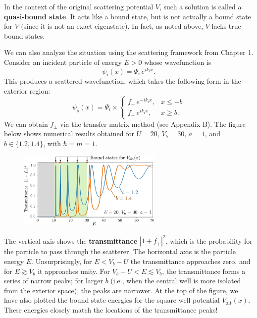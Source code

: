 \documentclass[pra,12pt]{revtex4-2}
\begin{document}
In the context of the original scattering potential $V$, such a
solution is called a \textbf{quasi-bound state}.  It acts like a bound
state, but is not actually a bound state for $V$ (since it is not an
exact eigenstate).  In fact, as noted above, $V$ lacks true bound
states.

We can also analyze the situation using the scattering framework from
Chapter 1.  Consider an incident particle of energy $E > 0$ whose
wavefunction is
\begin{equation}
  \psi_i(x) = \Psi_i \, e^{ik_i x}.
\end{equation}
This produces a scattered wavefunction, which takes the following form
in the exterior region:
\begin{equation}
  \psi_s(x) = \Psi_i \times \begin{cases}f_- \,e^{-ik_ix}, & x \le -b \\ f_+ \,e^{ik_ix}, & x \ge b.\end{cases}
\end{equation}
We can obtain $f_\pm$ via the transfer matrix method (see Appendix B).
The figure below shows numerical results obtained for $U = 20,\,V_b =
30,\,a=1$, and $b \in \{ 1.2, 1.4\}$, with $\hbar = m = 1$.

\begin{figure}[h]
  \centering\includegraphics[width=0.62\textwidth]{resonances}
\end{figure}

The vertical axis shows the \textbf{transmittance} $|1+f_+|^2$, which
is the probability for the particle to pass through the scatterer.
The horizontal axis is the particle energy $E$.  Unsurprisingly, for
$E < V_b-U$ the transmittance approaches zero, and for $E \gtrsim V_b$
it approaches unity.  For $V_b-U < E \lesssim V_b$, the transmittance
forms a series of narrow peaks; for larger $b$ (i.e., when the central
well is more isolated from the exterior space), the peaks are
narrower.  At the top of the figure, we have also plotted the bound
state energies for the square well potential $V_{\mathrm{alt}}(x)$.
These energies closely match the locations of the transmittance peaks!
\end{document}
